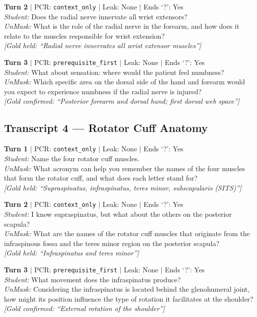 \documentclass[11pt]{article}
\begin{document}
\noindent\textbf{Turn 2} $|$ PCR: \texttt{context\_only} $|$ Leak: None $|$ Ends `?': Yes\\
\textit{Student:} Does the radial nerve innervate all wrist extensors?\\
\textit{UnMask:} What is the role of the radial nerve in the forearm, and how does it relate to the muscles responsible for wrist extension?\\
{\small\textit{[Gold held: ``Radial nerve innervates all wrist extensor muscles'']}}

\noindent\textbf{Turn 3} $|$ PCR: \texttt{prerequisite\_first} $|$ Leak: None $|$ Ends `?': Yes\\
\textit{Student:} What about sensation: where would the patient feel numbness?\\
\textit{UnMask:} Which specific area on the dorsal side of the hand and forearm would you expect to experience numbness if the radial nerve is injured?\\
{\small\textit{[Gold confirmed: ``Posterior forearm and dorsal hand; first dorsal web space'']}}

\subsection*{Transcript 4 --- Rotator Cuff Anatomy}

\noindent\textbf{Turn 1} $|$ PCR: \texttt{context\_only} $|$ Leak: None $|$ Ends `?': Yes\\
\textit{Student:} Name the four rotator cuff muscles.\\
\textit{UnMask:} What acronym can help you remember the names of the four muscles that form the rotator cuff, and what does each letter stand for?\\
{\small\textit{[Gold held: ``Supraspinatus, infraspinatus, teres minor, subscapularis (SITS)'']}}

\noindent\textbf{Turn 2} $|$ PCR: \texttt{context\_only} $|$ Leak: None $|$ Ends `?': Yes\\
\textit{Student:} I know supraspinatus, but what about the others on the posterior scapula?\\
\textit{UnMask:} What are the names of the rotator cuff muscles that originate from the infraspinous fossa and the teres minor region on the posterior scapula?\\
{\small\textit{[Gold held: ``Infraspinatus and teres minor'']}}

\noindent\textbf{Turn 3} $|$ PCR: \texttt{prerequisite\_first} $|$ Leak: None $|$ Ends `?': Yes\\
\textit{Student:} What movement does the infraspinatus produce?\\
\textit{UnMask:} Considering the infraspinatus is located behind the glenohumeral joint, how might its position influence the type of rotation it facilitates at the shoulder?\\
{\small\textit{[Gold confirmed: ``External rotation of the shoulder'']}}
\end{document}
